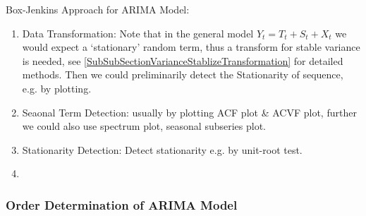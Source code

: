\begin{point}
    Box-Jenkins Approach for ARIMA Model:
\end{point}

    \begin{enumerate}[topsep=2pt,itemsep=0pt]
        \item Data Transformation: Note that in the general model $ Y_t=T_t+S_t+X_t $ we would expect a `stationary' random term, thus a transform for stable variance is needed, see \autoref{SubSubSectionVarianceStablizeTransformation} for detailed methods. Then we could preliminarily detect the Stationarity of sequence, e.g. by plotting.
        \item Seaonal Term Detection: usually by plotting ACF plot \& ACVF plot, further we could also use spectrum plot, seasonal subseries plot.
        \item Stationarity Detection: Detect stationarity e.g. by unit-root test.
        \item 
    \end{enumerate}
    
\subsubsection{Order Determination of ARIMA Model}

